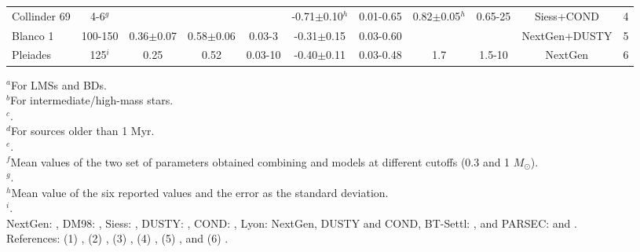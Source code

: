 \documentclass[12pt]{article}
\begin{document}
\begin{table}
\begin{threeparttable}
\begin{tabular}{@{\extracolsep{2pt}}lcccccccccc@{}}
   Collinder 69 & 4-6$^g$     &              &               &              & -0.71$\pm$0.10$^h$ & 0.01-0.65  & 0.82$\pm$0.05$^h$ & 0.65-25 & Siess+COND    & 4 \\
   Blanco 1     & 100-150     &0.36$\pm$0.07 & 0.58$\pm$0.06 & 0.03-3       & -0.31$\pm$0.15     & 0.03-0.60  &                   &         & NextGen+DUSTY & 5 \\
   Pleiades     & 125$^i$     & 0.25          & 0.52          & 0.03-10      & -0.40$\pm$0.11     & 0.03-0.48  & 1.7               & 1.5-10  & NextGen       & 6 \\
   \bottomrule
  \end{tabular}
  \begin{tablenotes}
    $^a$For LMSs and BDs.\\
    $^b$For intermediate/high-mass stars.\\
    $^c$\citet{Getman2014b}.\\
    $^d$For sources older than 1 Myr.\\
    $^e$\citet{ZapateroOsorio2002}.\\
    $^f$Mean values of the two set of parameters obtained combining \citet{Baraffe1998} and \citet{Siess2000} models at different cutoffs (0.3 and 1 $M_\odot$).\\
    $^g$\citet{Dolan1999}.\\
    $^h$Mean value of the six reported values and the error as the standard deviation.\\
    $^i$\citet{Stauffer1998}.\\

    NextGen: \citet{Baraffe1998}, DM98: \citet{DAntona1998}, Siess: \citet{Siess2000}, DUSTY: \citep{Chabrier2000}, COND: \citep{Baraffe2003}, Lyon: NextGen, DUSTY and COND, \ac{BT-Settl}: \citet{Baraffe2015}, and \ac{PARSEC}: \citet{Bressan2012} and \citet{Chen2014}.\\

    References: (1) \citet{Muzic2017}, (2) \citet{DaRio2012}, (3) \citet{PenaRamirez2012}, (4) \citet{Bayo2011}, (5) \citet{Moraux2007a}, and (6) \citet{Moraux2003}.
  \end{tablenotes}
 \end{threeparttable}
\end{table}
\end{document}
